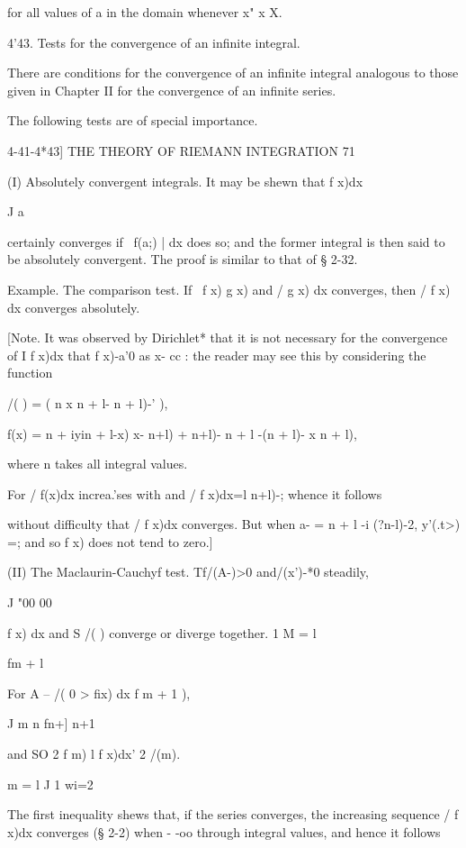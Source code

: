 for all values of a in the domain whenever x" x X.

4'43. Tests for the convergence of an infinite integral.

There are conditions for the convergence of an infinite integral
analogous to those given in Chapter II for the convergence of an
infinite series.

The following tests are of special importance.






4-41-4*43] THE THEORY OF RIEMANN INTEGRATION 71



(I) Absolutely convergent integrals. It may be shewn that f x)dx

J a

certainly converges if \ f(a;) | dx does so; and the former integral
is then said to be absolutely convergent. The proof is similar to that
of § 2-32.

Example. The comparison test. If \ f x) g x) and / g x) dx converges,
then / f x) dx converges absolutely.

[Note. It was observed by Dirichlet* that it is not necessary for the
convergence of I f x)dx that f x)-a'0 as x- cc : the reader may see
this by considering the function

/( ) = ( n x n + l- n + l)-' ),

f(x) = n + iyin + l-x) x- n+l) + n+l)- n + l -(n + l)- x n + l),

where n takes all integral values.

For / f(x)dx increa.'ses with and / f x)dx=l n+l)-; whence it follows

without difficulty that / f x)dx converges. But when a- = n + l -i
(?n-l)-2, y'(.t>) =; and so f x) does not tend to zero.]

(II) The Maclaurin-Cauchyf test. Tf/(A-)>0 and/(x')-*0 steadily,

J "00 00

f x) dx and S /( ) converge or diverge together. 1 M = l

fm + l

For A -- /( 0 > fix) dx f m + 1 ),

J m n fn+] n+1

and SO 2 f m) l f x)dx' 2 /(m).

  m = l J 1 wi=2

The first inequality shews that, if the series converges, the
increasing sequence / f x)dx converges (§ 2-2) when - -oo through
integral values, and hence it follows

